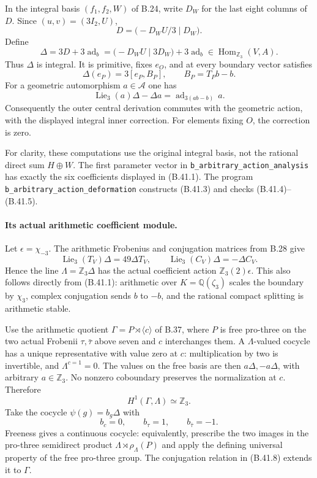 In the integral basis $(f_1,f_2,W)$ of B.24, write $D_W$ for
the last eight columns of $D$.  Since $(u,v)=(3I_2,U)$,
\[
 D=\bigl(-D_WU/3\mid D_W\bigr).
\]
Define
\[
 \Delta=3D+3\operatorname{ad}_b
       =\bigl(-D_WU\mid3D_W\bigr)+3\operatorname{ad}_b
       \in\operatorname{Hom}_{\mathbb Z_3}(V,A).             \tag{B.41.3}
\]
Thus $\Delta$ is integral.  It is primitive, fixes $e_O$, and
at every boundary vector satisfies
\[
 \Delta(e_P)=3[e_P,B_P],\qquad B_P=T_Pb-b.                  \tag{B.41.4}
\]
For a geometric automorphism $a\in\mathcal A$ one has
\[
 \operatorname{Lie}_3(a)\Delta-\Delta a
    =\operatorname{ad}_{3(ab-b)}\,a.                       \tag{B.41.5}
\]
Consequently the outer central derivation commutes with the
geometric action, with the displayed integral inner correction.
For elements fixing $O$, the correction is zero.

For clarity, these computations use the original integral
basis, not the rational direct sum $H\oplus W$.  The first
parameter vector in \texttt{b\_arbitrary\_action\_analysis}
has exactly the six coefficients displayed in (B.41.1).
The program \texttt{b\_arbitrary\_action\_deformation}
constructs (B.41.3) and checks (B.41.4)--(B.41.5).

\paragraph{Its actual arithmetic coefficient module.}
Let $\epsilon=\chi_{-3}$.  The arithmetic Frobenius and
conjugation matrices from B.28 give
\[
 \operatorname{Lie}_3(T_V)\Delta=49\Delta T_V,
 \qquad
 \operatorname{Lie}_3(C_V)\Delta=-\Delta C_V.               \tag{B.41.6}
\]
Hence the line $\Lambda=\mathbb Z_3\Delta$ has the actual
coefficient action $\mathbb Z_3(2)\epsilon$.  This also
follows directly from (B.41.1): arithmetic over
$K=\mathbb Q(\zeta_3)$ scales the boundary by $\chi_3$,
complex conjugation sends $b$ to $-b$, and the rational
compact splitting is arithmetic stable.

Use the arithmetic quotient $\Gamma=P\rtimes\langle c\rangle$
of B.37, where $P$ is free pro-three on the two actual
Frobenii $\tau,\bar\tau$ above seven and $c$ interchanges
them.  A $\Lambda$-valued cocycle has a unique representative
with value zero at $c$: multiplication by two is invertible,
and $\Lambda^{c=1}=0$.  The values on the free basis are then
$a\Delta,-a\Delta$, with arbitrary $a\in\mathbb Z_3$.
No nonzero coboundary preserves the normalization at $c$.
Therefore
\[
 H^1(\Gamma,\Lambda)\simeq\mathbb Z_3.                    \tag{B.41.7}
\]
Take the cocycle $\psi(g)=b_g\Delta$ with
\[
 b_c=0,\qquad b_\tau=1,\qquad b_{\bar\tau}=-1.             \tag{B.41.8}
\]
Freeness gives a continuous cocycle: equivalently, prescribe
the two images in the pro-three semidirect product
$\Lambda\rtimes\rho_\Lambda(P)$ and apply the defining
universal property of the free pro-three group.  The
conjugation relation in (B.41.8) extends it to $\Gamma$.

